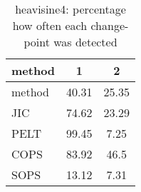 \begin{table}[ht]
\centering
\begin{tabular}{l|cc}
  \hline
method & 1 & 2 \\ 
  \hline
method &  40.31 &  25.35 \\ 
  JIC &  74.62 &  23.29 \\ 
  PELT &  99.45 &   7.25 \\ 
  COPS &  83.92 &   46.5 \\ 
  SOPS &  13.12 &   7.31 \\ 
   \hline
\end{tabular}
\caption{heavisine4: percentage how often each change-point was detected} 
\label{tab:heavisine4Detections}
\end{table}
